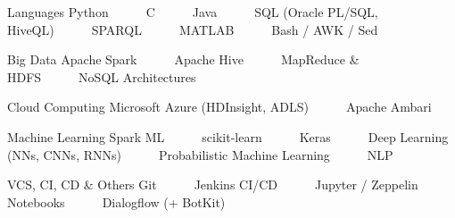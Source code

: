 

\begin{cvskills}

  \cvskill
    {Languages} %
    {Python~~~\textbullet~~~C~~~\textbullet~~~Java~~~\textbullet~~~SQL (Oracle PL/SQL, HiveQL)~~~\textbullet~~~SPARQL~~~\textbullet~~~MATLAB~~~\textbullet~~~Bash / AWK / Sed} %

  \cvskill
    {Big Data} %
    {Apache Spark~~~\textbullet~~~Apache Hive~~~\textbullet~~~MapReduce \& HDFS~~~\textbullet~~~NoSQL Architectures} %
    
\cvskill
    {Cloud Computing} %
    {Microsoft Azure (HDInsight, ADLS)~~~\textbullet~~~Apache Ambari} %

  \cvskill
    {Machine Learning} %
    {Spark ML~~~\textbullet~~~scikit-learn~~~\textbullet~~~Keras~~~\textbullet~~~Deep Learning (NNs, CNNs, RNNs)~~~\textbullet~~~Probabilistic Machine Learning~~~\textbullet~~~NLP} %

  \cvskill
    {VCS, CI, CD \& Others} %
    {Git~~~\textbullet~~~Jenkins CI/CD~~~\textbullet~~~Jupyter / Zeppelin Notebooks~~~\textbullet~~~Dialogflow (+ BotKit)} %

\end{cvskills}

